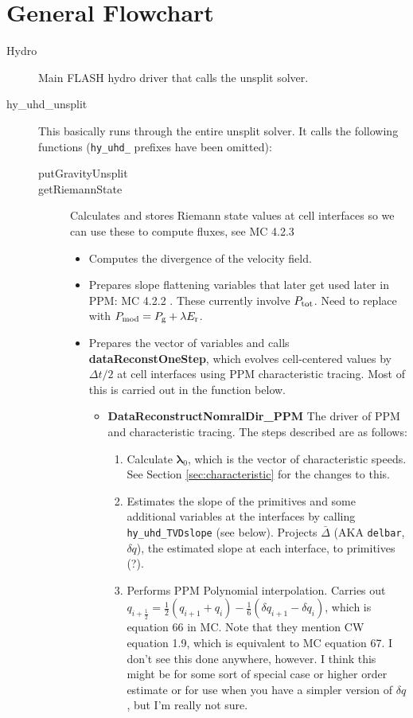 \documentclass[preprint,11pt]{aastex}
\begin{document}
\section{General Flowchart}
\label{sec:flowchart}
\begin{description}
	\item[Hydro] Main FLASH hydro driver that calls the unsplit solver.
	\item[hy\_uhd\_unsplit] This basically runs through the entire unsplit solver.  It calls the following functions (\verb!hy_uhd_! prefixes have been omitted):
	\begin{description}
		\item[putGravityUnsplit]
		\item[getRiemannState]  Calculates and stores Riemann state values at cell interfaces so we can use these to compute fluxes, see MC 4.2.3
		\begin{itemize}
			\item Computes the divergence of the velocity field.
			\item Prepares slope flattening variables that later get used later in PPM: MC 4.2.2 . {\color{red} These currently involve $P_{\rm tot}$.} {\color{blue} Need to replace with $P_{\rm mod} = P_{\rm g} + \lambda E_{\rm r}$}.
			\item Prepares the vector of variables and calls \textbf{dataReconstOneStep}, which evolves cell-centered values by $\Delta t / 2$ at cell interfaces using PPM characteristic tracing.  Most of this is carried out in the function below.
			\begin{itemize}
				\item \textbf{DataReconstructNomralDir\_PPM} The driver of PPM and characteristic tracing.  The steps described are as follows:
				\begin{enumerate}
					\item Calculate $\boldsymbol{\lambda}_0$, which is the vector of characteristic speeds. {\color{red} See Section \ref{sec:characteristic} for the changes to this.}
					\item Estimates the slope of the primitives and some additional variables at the interfaces by calling \verb!hy_uhd_TVDslope! (see below).  Projects $\bar{\Delta}$ (AKA \verb!delbar!, $\delta q$), the estimated slope at each interface, to primitives (?).%
					\item Performs PPM Polynomial interpolation.   Carries out $q_{i+\frac{1}{2}} = \frac{1}{2} \left( q_{i+1} + q_i \right) - \frac{1}{6} \left( \delta q_{i+1} - \delta q_i \right)$, which is equation 66 in MC.  Note that they mention CW equation 1.9, which is equivalent to MC equation 67.  I don't see this done anywhere, however.  I think this might be for some sort of special case or higher order estimate or for use when you have a simpler version of $\delta q$, but I'm really not sure.

\end{enumerate}
\end{itemize}
\end{itemize}
\end{description}
\end{description}
\end{document}
